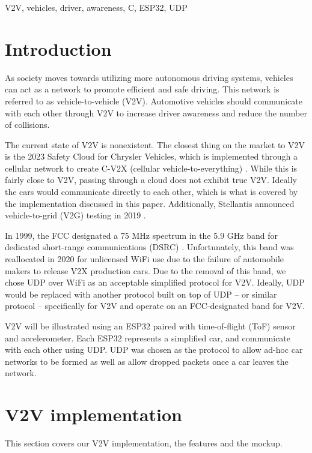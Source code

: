 \documentclass[conference]{IEEEtran}
\begin{document}
\begin{IEEEkeywords}
V2V, vehicles, driver, awareness, C, ESP32, UDP
\end{IEEEkeywords}

\section{Introduction}
As society moves towards utilizing more autonomous driving systems, vehicles can
act as a network to promote efficient and safe driving. This network is referred
to as vehicle-to-vehicle (V2V). Automotive vehicles should communicate with each
other through V2V to increase driver awareness and reduce the number of
collisions.

The current state of V2V is nonexistent. The closest thing on the market to V2V
is the 2023 Safety Cloud for Chrysler Vehicles, which is implemented through a
cellular network to create C-V2X (cellular vehicle-to-everything)
\cite{stone_2023, haas}.  While this is fairly close to V2V, passing through a
cloud does not exhibit true V2V. Ideally the cars would communicate directly to
each other, which is what is covered by the implementation discussed in this
paper. Additionally, Stellantis announced vehicle-to-grid (V2G) testing in 2019
\cite{media.stellantis_2020}.

In 1999, the FCC designated a 75 MHz spectrum in the 5.9 GHz band for dedicated
short-range communications (DSRC) \cite{hawkins_2022}. Unfortunately, this band was
reallocated in 2020 for unlicensed WiFi \cite{hawkins_2022} use due to the
failure of automobile makers to release V2X production cars. Due to the removal
of this band, we chose UDP over WiFi as an acceptable simplified protocol for
V2V. Ideally, UDP would be replaced with another protocol built on top of UDP --
or similar protocol -- specifically for V2V and operate on an FCC-designated
band for V2V.

V2V will be illustrated using an ESP32 paired with time-of-flight (ToF) sensor
and accelerometer. Each ESP32 represents a simplified car, and communicate with
each other using UDP. UDP was chosen as the protocol to allow ad-hoc car
networks to be formed as well as allow dropped packets once a car leaves the
network.

\section{V2V implementation}
This section covers our V2V implementation, the features and the mockup.
\end{document}
